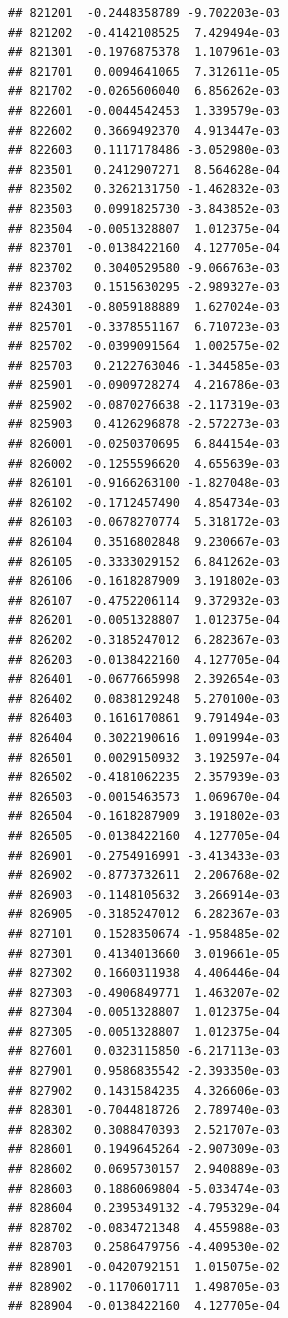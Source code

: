 \documentclass[ignorenonframetext,]{beamer}
\begin{document}
\begin{frame}[fragile]
\begin{verbatim}
## 821201  -0.2448358789 -9.702203e-03
## 821202  -0.4142108525  7.429494e-03
## 821301  -0.1976875378  1.107961e-03
## 821701   0.0094641065  7.312611e-05
## 821702  -0.0265606040  6.856262e-03
## 822601  -0.0044542453  1.339579e-03
## 822602   0.3669492370  4.913447e-03
## 822603   0.1117178486 -3.052980e-03
## 823501   0.2412907271  8.564628e-04
## 823502   0.3262131750 -1.462832e-03
## 823503   0.0991825730 -3.843852e-03
## 823504  -0.0051328807  1.012375e-04
## 823701  -0.0138422160  4.127705e-04
## 823702   0.3040529580 -9.066763e-03
## 823703   0.1515630295 -2.989327e-03
## 824301  -0.8059188889  1.627024e-03
## 825701  -0.3378551167  6.710723e-03
## 825702  -0.0399091564  1.002575e-02
## 825703   0.2122763046 -1.344585e-03
## 825901  -0.0909728274  4.216786e-03
## 825902  -0.0870276638 -2.117319e-03
## 825903   0.4126296878 -2.572273e-03
## 826001  -0.0250370695  6.844154e-03
## 826002  -0.1255596620  4.655639e-03
## 826101  -0.9166263100 -1.827048e-03
## 826102  -0.1712457490  4.854734e-03
## 826103  -0.0678270774  5.318172e-03
## 826104   0.3516802848  9.230667e-03
## 826105  -0.3333029152  6.841262e-03
## 826106  -0.1618287909  3.191802e-03
## 826107  -0.4752206114  9.372932e-03
## 826201  -0.0051328807  1.012375e-04
## 826202  -0.3185247012  6.282367e-03
## 826203  -0.0138422160  4.127705e-04
## 826401  -0.0677665998  2.392654e-03
## 826402   0.0838129248  5.270100e-03
## 826403   0.1616170861  9.791494e-03
## 826404   0.3022190616  1.091994e-03
## 826501   0.0029150932  3.192597e-04
## 826502  -0.4181062235  2.357939e-03
## 826503  -0.0015463573  1.069670e-04
## 826504  -0.1618287909  3.191802e-03
## 826505  -0.0138422160  4.127705e-04
## 826901  -0.2754916991 -3.413433e-03
## 826902  -0.8773732611  2.206768e-02
## 826903  -0.1148105632  3.266914e-03
## 826905  -0.3185247012  6.282367e-03
## 827101   0.1528350674 -1.958485e-02
## 827301   0.4134013660  3.019661e-05
## 827302   0.1660311938  4.406446e-04
## 827303  -0.4906849771  1.463207e-02
## 827304  -0.0051328807  1.012375e-04
## 827305  -0.0051328807  1.012375e-04
## 827601   0.0323115850 -6.217113e-03
## 827901   0.9586835542 -2.393350e-03
## 827902   0.1431584235  4.326606e-03
## 828301  -0.7044818726  2.789740e-03
## 828302   0.3088470393  2.521707e-03
## 828601   0.1949645264 -2.907309e-03
## 828602   0.0695730157  2.940889e-03
## 828603   0.1886069804 -5.033474e-03
## 828604   0.2395349132 -4.795329e-04
## 828702  -0.0834721348  4.455988e-03
## 828703   0.2586479756 -4.409530e-02
## 828901  -0.0420792151  1.015075e-02
## 828902  -0.1170601711  1.498705e-03
## 828904  -0.0138422160  4.127705e-04

\end{verbatim}
\end{frame}
\end{document}
